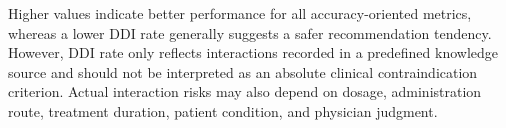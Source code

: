 \documentclass[manuscript,review]{acmart}
\begin{document}
Higher values indicate better performance for all accuracy-oriented metrics, whereas a lower DDI rate generally suggests a safer recommendation tendency. However, DDI rate only reflects interactions recorded in a predefined knowledge source and should not be interpreted as an absolute clinical contraindication criterion. Actual interaction risks may also depend on dosage, administration route, treatment duration, patient condition, and physician judgment.









\end{document}
